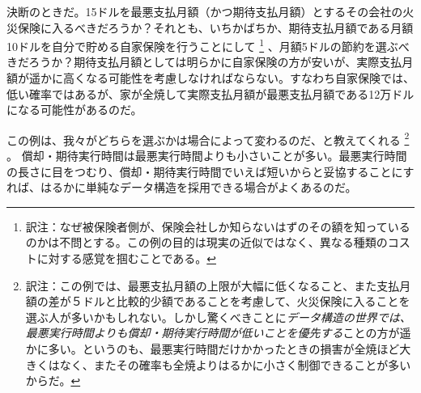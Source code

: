 決断のときだ。15ドルを最悪支払月額（かつ期待支払月額）とするその会社の火災保険に入るべきだろうか？それとも、いちかばちか、期待支払月額である月額10ドルを自分で貯める自家保険を行うことにして
\footnote{訳注：なぜ被保険者側が、保険会社しか知らないはずのその額を知っているのかは不問とする。この例の目的は現実の近似ではなく、異なる種類のコストに対する感覚を掴むことである。}
、月額5ドルの節約を選ぶべきだろうか？期待支払月額としては明らかに自家保険の方が安いが、実際支払月額が遥かに高くなる可能性を考慮しなければならない。すなわち自家保険では、低い確率ではあるが、家が全焼して実際支払月額が最悪支払月額である12万ドルになる可能性があるのだ。

この例は、我々がどちらを選ぶかは場合によって変わるのだ、と教えてくれる
\footnote{訳注：この例では、最悪支払月額の上限が大幅に低くなること、また支払月額の差が５ドルと比較的少額であることを考慮して、火災保険に入ることを選ぶ人が多いかもしれない。しかし驚くべきことに\emph{データ構造の世界では、最悪実行時間よりも償却・期待実行時間が低いことを優先する}ことの方が遥かに多い。というのも、最悪実行時間だけかかったときの損害が全焼ほど大きくはなく、またその確率も全焼よりはるかに小さく制御できることが多いからだ。}
。
償却・期待実行時間は最悪実行時間よりも小さいことが多い。最悪実行時間の長さに目をつむり、償却・期待実行時間でいえば短いからと妥協することにすれば、はるかに単純なデータ構造を採用できる場合がよくあるのだ。

